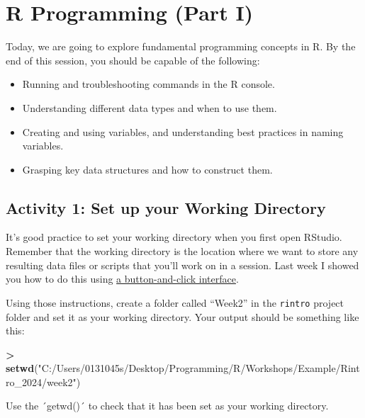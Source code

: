 \documentclass[
]{book}
\newenvironment{Shaded}{\begin{snugshade}}{\end{snugshade}}
\newcommand{\FunctionTok}[1]{\textcolor[rgb]{0.13,0.29,0.53}{\textbf{#1}}}
\newcommand{\NormalTok}[1]{#1}
\newcommand{\SpecialCharTok}[1]{\textcolor[rgb]{0.81,0.36,0.00}{\textbf{#1}}}
\newcommand{\StringTok}[1]{\textcolor[rgb]{0.31,0.60,0.02}{#1}}
\providecommand{\tightlist}{%
  \setlength{\itemsep}{0pt}\setlength{\parskip}{0pt}}
\begin{document}
\hypertarget{programming1}{%
\chapter{\texorpdfstring{\textbf{R Programming (Part I)}}{R Programming (Part I)}}\label{programming1}}

Today, we are going to explore fundamental programming concepts in R. By the end of this session, you should be capable of the following:

\begin{itemize}
\tightlist
\item
  Running and troubleshooting commands in the R console.
\item
  Understanding different data types and when to use them.
\item
  Creating and using variables, and understanding best practices in naming variables.
\item
  Grasping key data structures and how to construct them.
\end{itemize}

\hypertarget{activity-1-set-up-your-working-directory}{%
\section{Activity 1: Set up your Working Directory}\label{activity-1-set-up-your-working-directory}}

It's good practice to set your working directory when you first open RStudio. Remember that the working directory is the location where we want to store any resulting data files or scripts that you'll work on in a session. Last week I showed you how to do this using \protect\hyperlink{set_wd}{a button-and-click interface}.

Using those instructions, create a folder called ``Week2'' in the \texttt{rintro} project folder and set it as your working directory. Your output should be something like this:

\begin{Shaded}
\begin{Highlighting}[]
\SpecialCharTok{\textgreater{}} \FunctionTok{setwd}\NormalTok{(}\StringTok{"C:/Users/0131045s/Desktop/Programming/R/Workshops/Example/Rintro\_2024/week2"}\NormalTok{)}
\end{Highlighting}
\end{Shaded}

Use the ´getwd()´ to check that it has been set as your working directory.
\end{document}
